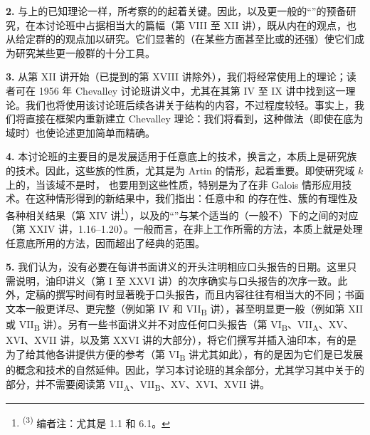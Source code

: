 \textbf{2.} 与上的已知理论一样，所考察的的起着关键。因此，以及更一般的“”的预备研究，在本讨论班中占据相当大的篇幅（第 VIII 至 XII 讲），既从内在的观点，也从给定群的的观点加以研究。它们显著的（在某些方面甚至比或的还强）使它们成为研究某些更一般群的十分工具。

\textbf{3.} 从第 XII 讲开始（已提到的第 XVIII 讲除外），我们将经常使用上的理论；读者可在 1956 年 Chevalley 讨论班讲义中，尤其在其第 IV 至 IX 讲中找到这一理论。我们也将使用该讨论班后续各讲关于结构的内容，不过程度较轻。事实上，我们将直接在框架内重新建立 Chevalley 理论：我们将看到，这种做法（即使在底为域时）也使论述更加简单而精确。

\textbf{4.} 本讨论班的主要目的是发展适用于任意底上的技术，换言之，本质上是研究族的技术。因此，这些族的性质，尤其是为 Artin 的情形，起着重要。即使研究域 $k$ 上的，当该域不是时，
也要用到这些性质，特别是为了在非 Galois 情形应用技术。在这种情形得到的新结果中，我们指出：任意中和 的存在性、簇的有理性及各种相关结果（第 XIV 讲\footnote{\textsuperscript{(3)} 编者注：尤其是 1.1 和 6.1。}），以及的“”与某个适当的（一般不）下的之间的对应（第 XXIV 讲，1.16--1.20）。一般而言，在非上工作所需的方法，本质上就是处理任意底所用的方法，因而超出了经典的范围。

\textbf{5.} 我们认为，没有必要在每讲书面讲义的开头注明相应口头报告的日期。这里只需说明，油印讲义（第 I 至 XXVI 讲）的次序确实与口头报告的次序一致。此外，定稿的撰写时间有时显著晚于口头报告，而且内容往往有相当大的不同；书面文本一般更详尽、更完整（例如第 IV 和 VII\textsubscript{B} 讲），甚至明显更一般（例如第 XII 或 VII\textsubscript{B} 讲）。另有一些书面讲义并不对应任何口头报告（第 VI\textsubscript{B}、VII\textsubscript{A}、XV、XVI、XVII 讲，以及第 XXVI 讲的大部分），将它们撰写并插入油印本，有的是为了给其他各讲提供方便的参考（第 VI\textsubscript{B} 讲尤其如此），有的是因为它们是已发展的概念和技术的自然延伸。因此，学习本讨论班的其余部分，尤其学习其中关于的部分，并不需要阅读第 VII\textsubscript{A}、VII\textsubscript{B}、XV、XVI、XVII 讲。

